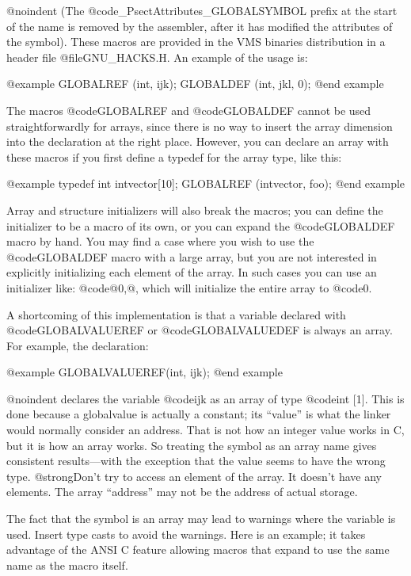 @noindent
(The @code{_$$PsectAttributes_GLOBALSYMBOL} prefix at the start of the
name is removed by the assembler, after it has modified the attributes
of the symbol).  These macros are provided in the VMS binaries
distribution in a header file @file{GNU_HACKS.H}.  An example of the
usage is:

@example
GLOBALREF (int, ijk);
GLOBALDEF (int, jkl, 0);
@end example

The macros @code{GLOBALREF} and @code{GLOBALDEF} cannot be used
straightforwardly for arrays, since there is no way to insert the array
dimension into the declaration at the right place.  However, you can
declare an array with these macros if you first define a typedef for the
array type, like this:

@example
typedef int intvector[10];
GLOBALREF (intvector, foo);
@end example

Array and structure initializers will also break the macros; you can
define the initializer to be a macro of its own, or you can expand the
@code{GLOBALDEF} macro by hand.  You may find a case where you wish to
use the @code{GLOBALDEF} macro with a large array, but you are not
interested in explicitly initializing each element of the array.  In
such cases you can use an initializer like: @code{@{0,@}}, which will
initialize the entire array to @code{0}.

A shortcoming of this implementation is that a variable declared with
@code{GLOBALVALUEREF} or @code{GLOBALVALUEDEF} is always an array.  For
example, the declaration:

@example
GLOBALVALUEREF(int, ijk);
@end example

@noindent
declares the variable @code{ijk} as an array of type @code{int [1]}.
This is done because a globalvalue is actually a constant; its ``value''
is what the linker would normally consider an address.  That is not how
an integer value works in C, but it is how an array works.  So treating
the symbol as an array name gives consistent results---with the
exception that the value seems to have the wrong type.  @strong{Don't
try to access an element of the array.}  It doesn't have any elements.
The array ``address'' may not be the address of actual storage.

The fact that the symbol is an array may lead to warnings where the
variable is used.  Insert type casts to avoid the warnings.  Here is an
example; it takes advantage of the ANSI C feature allowing macros that
expand to use the same name as the macro itself.

